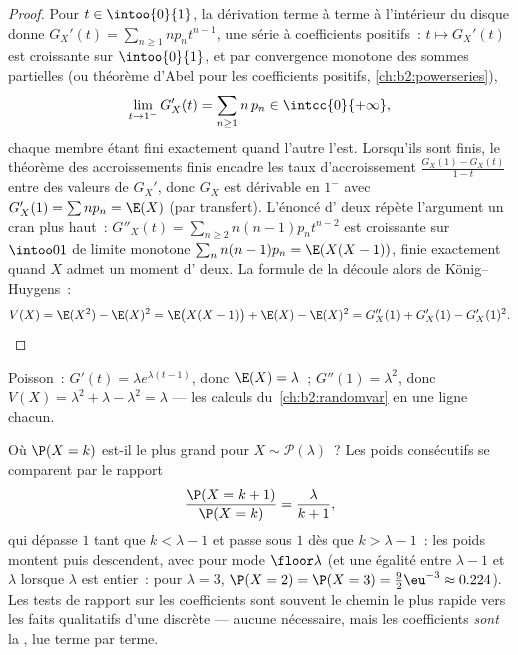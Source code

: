 \begin{proof}
Pour $t \in \intoo{0}{1}$, la dérivation terme à terme à l'intérieur
du disque donne $G_X'(t) = \sum_{n\geq1} np_n t^{n-1}$, une série à
coefficients positifs~: $t \mapsto G_X'(t)$ est croissante sur
$\intoo{0}{1}$, et par convergence monotone des sommes partielles (ou
théorème d'Abel pour les coefficients positifs,
\cref{ch:b2:powerseries}),
\[
\lim_{t \to 1^-} G_X'(t)
= \sum_{n\geq1} n\,p_n \in \intcc{0}{+\infty} ,
\]
chaque membre étant fini exactement quand l'autre l'est. Lorsqu'ils
sont finis, le théorème des accroissements finis encadre les taux
d'accroissement $\frac{G_X(1) -
G_X(t)}{1 - t}$ entre des valeurs de $G_X'$, donc $G_X$ est
dérivable en $1^-$ avec $G_X'(1) = \sum np_n = \E(X)$ (par
transfert). L'énoncé d' deux répète l'argument un cran plus
haut~: $G''_X(t) = \sum_{n\geq2}n(n-1)p_nt^{n-2}$ est
croissante sur $\intoo01$ de limite monotone
$\sum_nn(n-1)p_n = \E(X(X-1))$, finie exactement quand $X$ admet
un moment d' deux. La formule de la  découle alors de
König--Huygens~:
\[
V(X) = \E(X^2) - \E(X)^2 = \E\bigl(X(X-1)\bigr) + \E(X) -
\E(X)^2 = G''_X(1) + G'_X(1) - G'_X(1)^2 .
\]
\end{proof}

\begin{example}
Poisson~: $G'(t) = \lambda e^{\lambda(t-1)}$, donc $\E(X) = \lambda$~;
$G''(1) = \lambda^2$, donc $V(X) = \lambda^2 + \lambda - \lambda^2 =
\lambda$ --- les calculs du~\cref{ch:b2:randomvar} en une
ligne chacun.
\end{example}

\begin{example}
\label{ex:b2:genfun:poissonmode}
Où $\P(X = k)$ est-il le plus grand pour $X \sim \mathcal
P(\lambda)$~? Les poids consécutifs se comparent par le rapport
\[
\frac{\P(X = k+1)}{\P(X = k)} = \frac{\lambda}{k + 1} ,
\]
qui dépasse $1$ tant que $k < \lambda - 1$ et passe sous
$1$ dès que $k > \lambda - 1$~: les poids montent puis descendent,
avec pour mode $\floor\lambda$ (et une égalité entre $\lambda - 1$ et
$\lambda$ lorsque $\lambda$ est entier~: pour $\lambda = 3$,
$\P(X = 2) = \P(X = 3) = \frac92\eu^{-3} \approx 0.224$).
Les tests de rapport sur les coefficients sont souvent le chemin le
plus rapide vers les faits qualitatifs d'une  discrète --- aucune
 nécessaire, mais les coefficients \emph{sont} la
, lue terme par terme.
\end{example}

